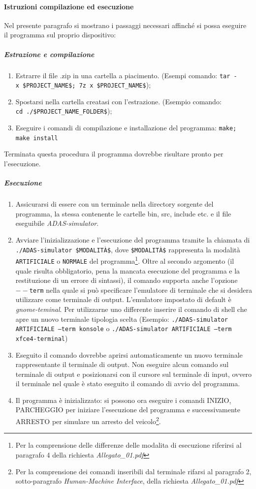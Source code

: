 \documentclass[11pt, openany]{article}
\theoremstyle{definition}
\theoremstyle{plain}
\theoremstyle{remark}
\begin{document}
		\paragraph{Istruzioni compilazione ed esecuzione}
			Nel presente paragrafo si mostrano i passaggi necessari affinché si possa eseguire il programma sul proprio dispositivo:
			\subparagraph{Estrazione e compilazione}
				\begin{enumerate}
					\item Estrarre il file .zip in una cartella a piacimento. (Esempi comando: \texttt{tar~-x~\$PROJECT\_NAME\$; \texttt{7z~x~\$PROJECT\_NAME\$}});
					\item Spostarsi nella cartella creatasi con l'estrazione. (Esempio comando: \texttt{cd~./\$PROJECT\_NAME\_FOLDER\$});
					\item Eseguire i comandi di compilazione e  installazione del programma: \texttt{make; make install}
				\end{enumerate}
				Terminata questa procedura il programma dovrebbe risultare pronto per l'esecuzione.
				\subparagraph{Esecuzione}
					\begin{enumerate}
						\item Assicurarsi di essere con un terminale nella directory sorgente del programma, la stessa contenente le cartelle bin, src, include etc. e il file eseguibile \textit{ADAS-simulator}.
						\item Avviare l'inizializzazione e l'esecuzione del programma tramite la chiamata di \texttt{./ADAS-simulator \$MODALITÀ\$}, dove \texttt{\$MODALITÀ\$} rappresenta la modalità \texttt{ARTIFICIALE} o \texttt{NORMALE} del programma\footnote{Per la comprensione delle differenze delle modalita di esecuzione riferirsi al paragrafo 4 della richiesta \textit{Allegato\_01.pdf}}.
						Oltre al secondo argomento (il quale risulta obbligatorio, pena la mancata esecuzione del programma e la restituzione di un errore di sintassi), il comando supporta anche l'opzione \texttt{$--$term} nella quale si può specificare l'emulatore di terminale che si desidera utilizzare come terminale di output. L'emulatore impostato di default è \textit{gnome-teminal}. Per utilizzarne uno differente inserire il comando di shell che apre un nuovo terminale tipologia scelta (Esempio: \texttt{./ADAS-simulator ARTIFICIALE --term konsole} o \texttt{./ADAS-simulator ARTIFICIALE --term xfce4-terminal})
						\item Eseguito il comando dovrebbe aprirsi automaticamente un nuovo terminale rappresentante il terminale di output. Non eseguire alcun comando sul terminale di output e posizionarsi con il cursore sul terminale di input, ovvero il terminale nel quale è stato eseguito il comando di avvio del programma.
						\item Il programma è inizializzato: si possono ora eseguire i comandi INIZIO, PARCHEGGIO per iniziare l'esecuzione del programma e successivamente ARRESTO per simulare un arresto del veicolo\footnote{Per la comprensione dei comandi inseribili dal terminale rifarsi al paragrafo 2, sotto-paragrafo \textit{Human-Machine Interface}, della richiesta \textit{Allegato\_01.pdf}}.
				\end{enumerate}
\end{document}
